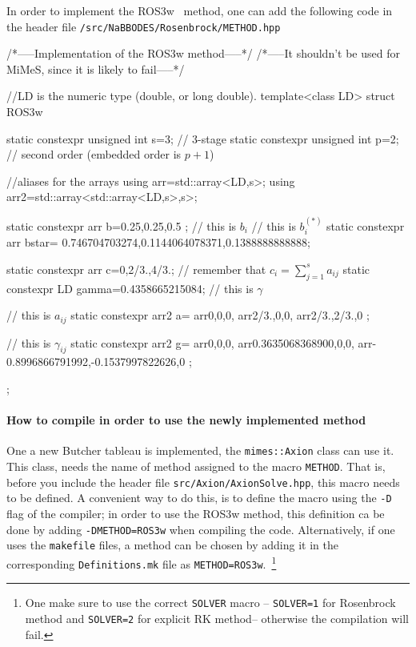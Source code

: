 \documentclass[11pt,a4paper]{article}
\begin{document}
In order to implement the ROS3w~\cite{RangAngermann2005} method, one can add the following code in the header file {\tt \mimes/src/NaBBODES/Rosenbrock/METHOD.hpp}
%
\begin{cpp}
	/*-----Implementation of the ROS3w method-----*/
	/*-----It shouldn't be used for MiMeS, since it is likely to fail-----*/
	
	
	//LD is the numeric type (\ie double, or long double).
	template<class LD>
	struct ROS3w{
		static constexpr unsigned int s=3; // 3-stage
		static constexpr unsigned int p=2; // second order (embedded order is $p+1$)
		
		//aliases for the arrays
		using arr=std::array<LD,s>;
		using arr2=std::array<std::array<LD,s>,s>;

		static constexpr arr b={0.25,0.25,0.5 };  // this is $b_i$
		// this is $b_i^{(*)}$
		static constexpr arr bstar={ 0.746704703274,0.1144064078371,0.1388888888888};  
		
		static constexpr arr c={0,2/3.,4/3.}; // remember that $c_i = \displaystyle\sum_{j=1}^{s} a_{ij}$
		static constexpr LD gamma=0.4358665215084; // this is $\gamma$
		
		// this is $a_{ij}$
		static constexpr arr2 a={
			arr{0,0,0},
			arr{2/3.,0,0},
			arr{2/3.,2/3.,0}	
		};
	
		// this is $\gamma_{ij}$	
		static constexpr arr2 g={
			arr{0,0,0},
			arr{0.3635068368900,0,0},
			arr{-0.8996866791992,-0.1537997822626,0}
		};
	};
\end{cpp}

\paragraph{How to compile \mimes in order to use the newly implemented method} One a new Butcher tableau is implemented, the {\tt mimes::Axion} class can use it. This class, needs the name of method assigned to the macro {\tt METHOD}. That is, before you include the header file {\tt src/Axion/AxionSolve.hpp}, this macro needs to be defined. A convenient way to do this, is to define the macro using the {\tt -D} flag of the compiler; \eg in order to use the ROS3w method, this definition ca be done by adding  {\tt -DMETHOD=ROS3w} when compiling the code. Alternatively, if one uses the {\tt makefile} files, a method can be chosen by adding it in the corresponding {\tt Definitions.mk} file as {\tt METHOD=ROS3w}.~\footnote{One make sure to use the correct {\tt SOLVER} macro -- {\tt SOLVER=1} for Rosenbrock method  and {\tt SOLVER=2} for explicit RK method-- otherwise the compilation will fail.} 
\end{document}
